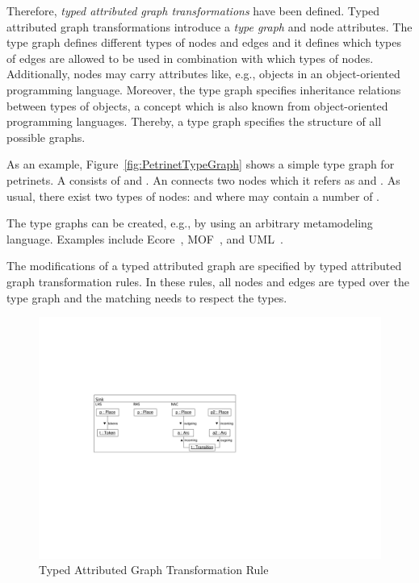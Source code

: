Therefore, \emph{typed attributed graph transformations} \cite{EEPT06} have been defined.
Typed attributed graph transformations introduce a \emph{type graph} and node attributes.
The type graph defines different types of nodes and edges and it defines which types of edges are allowed to be used in combination with which types of nodes.
Additionally, nodes may carry attributes like, e.g., objects in an object-oriented programming language.
Moreover, the type graph specifies inheritance relations between types of objects, a concept which is also known from object-oriented programming languages. Thereby, a type graph specifies the structure of all possible graphs.

As an example, Figure~\ref{fig:PetrinetTypeGraph} shows a simple type graph for petrinets.
A  consists of  and .
An  connects two nodes which it refers as  and .
As usual, there exist two types of nodes:  and  where  may contain a number of .

The type graphs can be created, e.g., by using an arbitrary metamodeling language.
Examples include Ecore~\cite{SBP+08}, MOF~\cite{MOF05}, and UML~\cite{UML23}.

The modifications of a typed attributed graph are specified by typed attributed graph transformation rules.
In these rules, all nodes and edges are typed over the type graph  and the matching needs to respect the types.

\begin{figure}[htb]
  \centering
  \includegraphics[scale=1]{figures/TypedGTRule}
  \caption{Typed Attributed Graph Transformation Rule}
  \label{fig:typedGTRule}
\end{figure}


